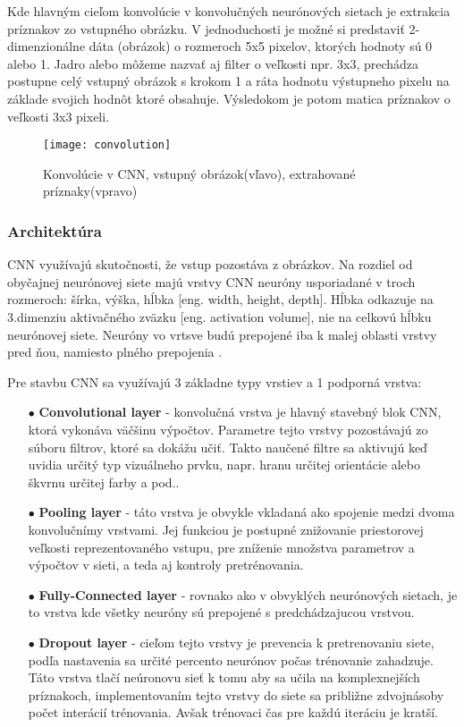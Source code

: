 Kde hlavným cieľom konvolúcie v konvolučných neurónových sietach je extrakcia príznakov zo vstupného obrázku.
V jednoduchosti je možné si predstaviť 2-dimenzionálne dáta (obrázok) o rozmeroch 5x5 pixelov, ktorých hodnoty sú 0 alebo 1.
Jadro alebo môžeme nazvať aj filter o veľkosti npr. 3x3, prechádza postupne celý vstupný obrázok s krokom 1 a ráta hodnotu výstupneho pixelu na základe svojich hodnôt ktoré obsahuje.
Výsledokom je potom matica príznakov o veľkosti 3x3 pixeli\cite{odkaz:CNNArticle}.
\begin{figure}[H]
    \centering
    \texttt{[image: convolution]}
    \caption{Konvolúcie v CNN, vstupný obrázok(vľavo), extrahované príznaky(vpravo)\cite{odkaz:CNNArticle}}
    \label{pic:Convolution}
\end{figure}



\subsubsection{Architektúra}
CNN využívajú skutočnosti, že vstup pozostáva z obrázkov.
Na rozdiel od obyčajnej neurónovej siete majú vrstvy CNN neuróny usporiadané v troch rozmeroch: šírka, výška, hĺbka [eng. width, height, depth].
Hĺbka odkazuje na 3.dimenziu aktivačného zväzku [eng. activation volume], nie na celkovú hĺbku neurónovej siete.
Neuróny vo vrtsve budú prepojené iba k malej oblasti vrstvy pred ňou, namiesto plného prepojenia \cite{odkaz:CNNArchitecture}.

Pre stavbu CNN sa využívajú 3 základne typy vrstiev a 1 podporná vrstva:
\begin{enumerate}
    \item[$\bullet$] \textbf{Convolutional layer} - konvolučná vrstva je hlavný stavebný blok CNN, ktorá vykonáva väčšinu výpočtov.
    Parametre tejto vrstvy pozostávajú zo súboru filtrov, ktoré sa dokážu učiť.
    Takto naučené filtre sa aktivujú keď uvidia určitý typ vizuálneho prvku, napr. hranu určitej orientácie alebo škvrnu určitej farby a pod..
    \item[$\bullet$] \textbf{Pooling layer} - táto vrstva je obvykle vkladaná ako spojenie medzi dvoma konvolučnímy vrstvami.
    Jej funkciou je postupné znižovanie priestorovej veľkosti reprezentovaného vstupu, pre zníženie množstva parametrov a výpočtov v sieti, a teda aj kontroly pretrénovania.
    \item[$\bullet$] \textbf{Fully-Connected layer} - rovnako ako v obvyklých neurónových sietach, je to vrstva kde všetky neuróny sú prepojené s predchádzajucou vrstvou.
    \item[$\bullet$] \textbf{Dropout layer} - cieľom tejto vrstvy je prevencia k pretrenovaniu siete, podľa nastavenia sa určité percento neurónov počas trénovanie zahadzuje.
    Táto vrstva tlačí neúronovu sieť k tomu aby sa učila na komplexnejších príznakoch, implementovaním tejto vrstvy do siete sa približne zdvojnásoby počet interácií trénovania.
    Avšak trénovaci čas pre každú iteráciu je kratší.
\end{enumerate}


